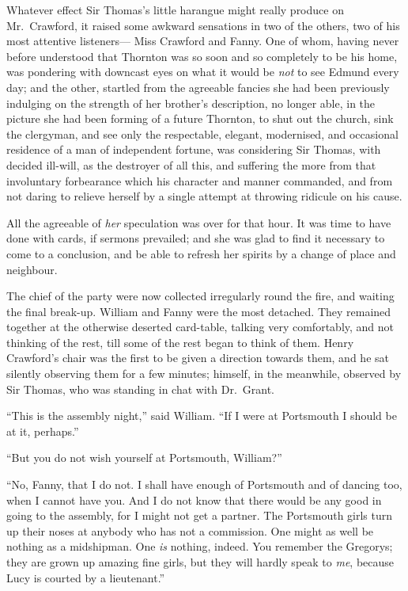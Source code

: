 Whatever effect Sir Thomas's little harangue might really
produce on Mr.\ Crawford, it raised some awkward sensations
in two of the others, two of his most attentive listeners---%
Miss Crawford and Fanny.  One of whom, having never before
understood that Thornton was so soon and so completely
to be his home, was pondering with downcast eyes on what it
would be \emph{not} to see Edmund every day; and the other,
startled from the agreeable fancies she had been previously
indulging on the strength of her brother's description,
no longer able, in the picture she had been forming of a
future Thornton, to shut out the church, sink the clergyman,
and see only the respectable, elegant, modernised,
and occasional residence of a man of independent fortune,
was considering Sir Thomas, with decided ill-will,
as the destroyer of all this, and suffering the more
from that involuntary forbearance which his character
and manner commanded, and from not daring to relieve
herself by a single attempt at throwing ridicule on his cause.

All the agreeable of \emph{her} speculation was over for that hour.
It was time to have done with cards, if sermons prevailed;
and she was glad to find it necessary to come to a conclusion,
and be able to refresh her spirits by a change of place
and neighbour.

The chief of the party were now collected irregularly
round the fire, and waiting the final break-up. William
and Fanny were the most detached.  They remained
together at the otherwise deserted card-table, talking
very comfortably, and not thinking of the rest, till some
of the rest began to think of them.  Henry Crawford's
chair was the first to be given a direction towards them,
and he sat silently observing them for a few minutes;
himself, in the meanwhile, observed by Sir Thomas,
who was standing in chat with Dr.\ Grant.

``This is the assembly night,'' said William.  ``If I were
at Portsmouth I should be at it, perhaps.''

``But you do not wish yourself at Portsmouth, William?''

``No, Fanny, that I do not.  I shall have enough of Portsmouth
and of dancing too, when I cannot have you.  And I do not
know that there would be any good in going to the assembly,
for I might not get a partner.  The Portsmouth girls turn
up their noses at anybody who has not a commission.
One might as well be nothing as a midshipman.
One \emph{is} nothing, indeed.  You remember the Gregorys;
they are grown up amazing fine girls, but they will hardly
speak to \emph{me}, because Lucy is courted by a lieutenant.''

